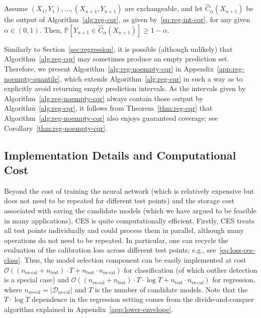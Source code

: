 \begin{theorem} \label{thm:reg-cqr}
Assume $(X_{1},Y_{1}), \ldots, (X_{n+1},Y_{n+1})$ are exchangeable, and let $\hat{C}_{\alpha}(X_{n+1})$ be the output of Algorithm~\ref{alg:reg-cqr}, as given by~\eqref{eq:reg-int-cqr}, for any given $\alpha \in (0,1)$.
Then, $\mathbb{P}[Y_{n+1} \in \hat{C}_{\alpha}(X_{n+1})] \geq 1-\alpha$.
\end{theorem}

Similarly to Section~\ref{sec:regression}, it is possible (although unlikely) that Algorithm~\ref{alg:reg-cqr} may sometimes produce an empty prediction set.
Therefore, we present Algorithm~\ref{alg:reg-noempty-cqr} in Appendix~\ref{app:reg-noempty-quantile}, which extends Algorithm~\ref{alg:reg-cqr} in such a way as to explicitly avoid returning empty prediction intervals.
As the intervals given by Algorithm~\ref{alg:reg-noempty-cqr} always contain those output by Algorithm~\ref{alg:reg-cqr}, it follows from Theorem~\ref{thm:reg-cqr} that Algorithm~\ref{alg:reg-noempty-cqr} also enjoys guaranteed coverage; see Corollary~\ref{thm:reg-noempty-cqr}.

\subsection{Implementation Details and Computational Cost}

Beyond the cost of training the neural network (which is relatively expensive but does not need to be repeated for different test points) and the storage cost associated with saving the candidate models (which we have argued to be feasible in many applications), CES is quite computationally efficient.
Firstly, CES treats all test points individually and could process them in parallel, although many operations do not need to be repeated. In particular, one can recycle the evaluation of the calibration loss across different test points; e.g., see~\eqref{eq:loss-ces-class}. 
Thus, the model selection component can be easily implemented at cost $\mathcal{O}((n_{\text{es-cal}} + n_{\text{test}}) \cdot T + n_{\text{test}} \cdot n_{\text{es-cal}})$ for classification (of which outlier detection is a special case) and $\mathcal{O}((n_{\text{es-cal}} + n_{\text{test}}) \cdot T \cdot \log T + n_{\text{test}} \cdot n_{\text{es-cal}})$ for regression, where $n_{\text{es-cal}} = |\mathcal{D}_{\text{es-cal}}|$ and $T$ is the number of candidate models. Note that the $T \cdot \log T$ dependence in the regression setting comes from the divide-and-conquer algorithm explained in Appendix~\ref{app:lower-envelope}.

